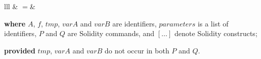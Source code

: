 \documentclass[manuscript,screen,review]{acmart}
\begin{document}
\begin{refactoring}[htb]
\begin{footnotesize}
\begin{tabular}{lll}
   & $=$&

\end{tabular}

\noindent \textbf{where} $A$, $f$, $\mathit{tmp}$, $\mathit{varA}$ and $\mathit{varB}$ are identifiers, $\mathit{parameters}$ is a list of identifiers, $P$ and $Q$ are Solidity commands, and $[\ldots]$ denote Solidity constructs;

\noindent \textbf{provided} $\mathit{tmp}$, $\mathit{varA}$ and $\mathit{varB}$ do not occur in both $P$ and $Q$.

\caption{Single Line Swap}
\label{rule:swap}
\end{footnotesize}
\end{refactoring}
\end{document}
